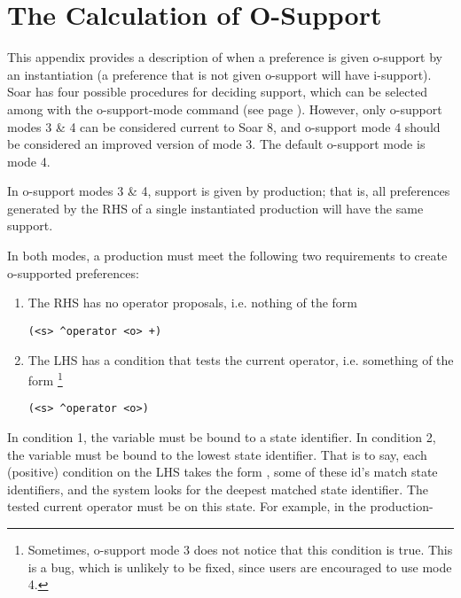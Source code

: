 \chapter{The Calculation of O-Support}
\label{SUPPORT}

This appendix provides a description of when a preference is given o-support by an instantiation (a preference that is not given o-support will have i-support). Soar has four possible procedures for deciding support, which can be selected among with the o-support-mode command (see page \pageref{o-support-mode}). However, only o-support modes 3 \& 4 can be considered current to Soar 8, and o-support mode 4 should be considered an improved version of mode 3.   The default o-support mode is mode 4.

In o-support modes 3 \& 4, support is given by production; that is, all preferences generated by the RHS of a single instantiated production will have the same support. 


In both modes, a production must meet the following two requirements to create o-supported preferences:
\begin{enumerate}
\item The RHS has no operator proposals, i.e. nothing of the form \begin{verbatim}(<s> ^operator <o> +) \end{verbatim}
\item The LHS has a condition that tests the current operator, i.e. something of the form
\footnote{Sometimes, o-support mode 3 does not notice that this condition is true. This is a bug, which is unlikely to be fixed, since users are encouraged to use mode 4.}
\begin{verbatim}(<s> ^operator <o>)\end{verbatim}
\end{enumerate}



In condition 1, the variable  must be bound to a state identifier.
In condition 2, the variable  must be bound to the lowest state identifier. That is to say, each (positive) condition on the LHS takes the form , some of these id's match state identifiers, and the system looks for the deepest matched state identifier. The tested current operator must be on this state. For example, in the production-

